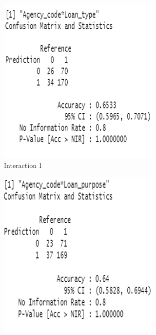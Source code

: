 \documentclass{jpp}
\begin{document}
\begin{figure}
\begin{subfigure}{.475\textwidth}
  \centering
  \includegraphics[width=.9\linewidth]{interaction1.png}  
  \caption{Interaction 1}
\end{subfigure}
\begin{subfigure}{.475\textwidth}
  \centering
  \includegraphics[width=.9\linewidth]{interaction2.png}  

\end{subfigure}
\end{figure}
\end{document}
